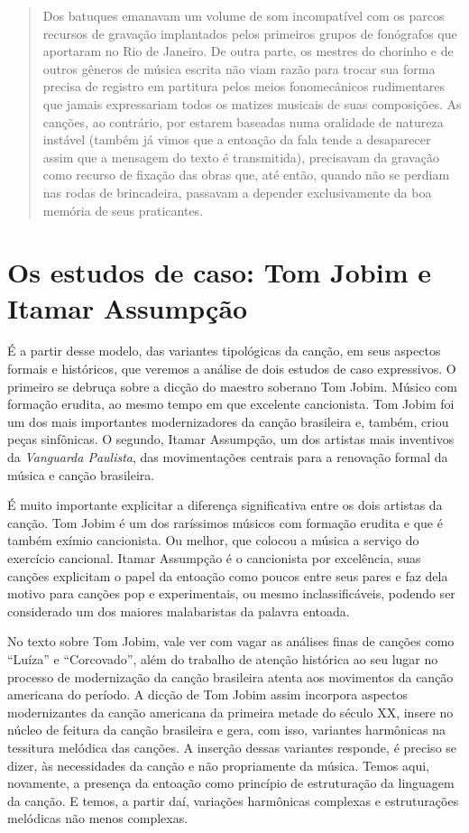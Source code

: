\begin{quote}
Dos batuques emanavam um volume de som incompatível com os parcos
recursos de gravação implantados pelos primeiros grupos de fonógrafos
que aportaram no Rio de Janeiro. De outra parte, os mestres do chorinho
e de outros gêneros de música escrita não viam razão para trocar sua
forma precisa de registro em partitura pelos meios fonomecânicos
rudimentares que jamais expressariam todos os matizes musicais de suas
composições. As canções, ao contrário, por estarem baseadas numa
oralidade de natureza instável (também já vimos que a entoação da fala
tende a desaparecer assim que a mensagem do texto é transmitida),
precisavam da gravação como recurso de fixação das obras que, até então,
quando não se perdiam nas rodas de brincadeira, passavam a depender
exclusivamente da boa memória de seus praticantes.
\end{quote}

\section{Os estudos de caso: Tom Jobim e Itamar Assumpção}

É a partir desse modelo, das variantes tipológicas da canção, em seus
aspectos formais e históricos, que veremos a análise de dois estudos de
caso expressivos. O primeiro se debruça sobre a dicção do maestro
soberano Tom Jobim. Músico com formação erudita, ao mesmo tempo em que
excelente cancionista. Tom Jobim foi um dos mais importantes
modernizadores da canção brasileira e, também, criou peças sinfônicas. O
segundo, Itamar Assumpção, um dos artistas mais inventivos da
\emph{Vanguarda Paulista}, das movimentações centrais para a renovação
formal da música e canção brasileira.

É muito importante explicitar a diferença significativa entre os dois
artistas da canção. Tom Jobim é um dos raríssimos músicos com formação
erudita e que é também exímio cancionista. Ou melhor, que colocou a
música a serviço do exercício cancional. Itamar Assumpção é o
cancionista por excelência, suas canções explicitam o papel da entoação
como poucos entre seus pares e faz dela motivo para canções pop e
experimentais, ou mesmo inclassificáveis, podendo ser considerado um dos
maiores malabaristas da palavra entoada.

No texto sobre Tom Jobim, vale ver com vagar as análises finas de
canções como ``Luíza'' e ``Corcovado'', além do trabalho de atenção
histórica ao seu lugar no processo de modernização da canção brasileira
atenta aos movimentos da canção americana do período. A dicção de Tom
Jobim assim incorpora aspectos modernizantes da canção americana da
primeira metade do século XX, insere no núcleo de feitura da canção
brasileira e gera, com isso, variantes harmônicas na tessitura melódica
das canções. A inserção dessas variantes responde, é preciso se dizer,
às necessidades da canção e não propriamente da música. Temos aqui,
novamente, a presença da entoação como princípio de estruturação da
linguagem da canção. E temos, a partir daí, variações harmônicas
complexas e estruturações melódicas não menos complexas.

